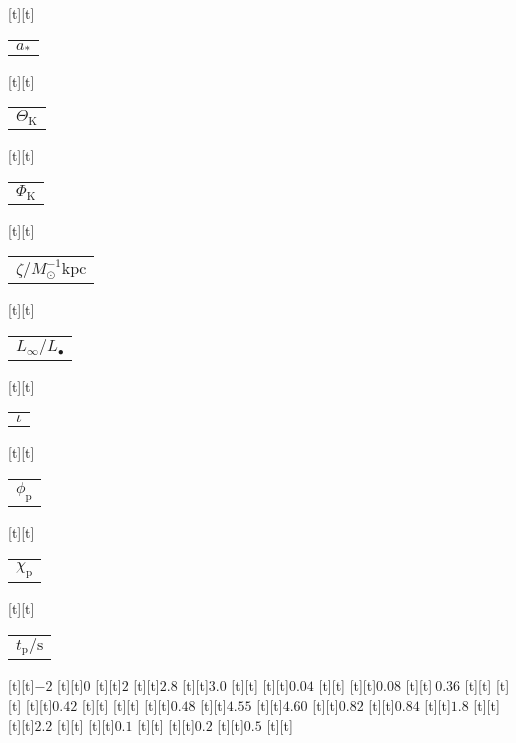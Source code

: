 \begin{psfrags}
[t][t]{\color[rgb]{0,0,0}\setlength{\tabcolsep}{0pt}\begin{tabular}{c}{$a_\ast$}\end{tabular}}%
[t][t]{\color[rgb]{0,0,0}\setlength{\tabcolsep}{0pt}\begin{tabular}{c}{$\Theta_\mathrm{K}$}\end{tabular}}%
[t][t]{\color[rgb]{0,0,0}\setlength{\tabcolsep}{0pt}\begin{tabular}{c}{$\Phi_\mathrm{K}$}\end{tabular}}%
[t][t]{\color[rgb]{0,0,0}\setlength{\tabcolsep}{0pt}\begin{tabular}{c}{$\zeta/M_\odot^{-1} \mathrm{kpc}$}\end{tabular}}%
[t][t]{\color[rgb]{0,0,0}\setlength{\tabcolsep}{0pt}\begin{tabular}{c}{$L_\infty/L_\bullet$}\end{tabular}}%
[t][t]{\color[rgb]{0,0,0}\setlength{\tabcolsep}{0pt}\begin{tabular}{c}{$\iota$}\end{tabular}}%
[t][t]{\color[rgb]{0,0,0}\setlength{\tabcolsep}{0pt}\begin{tabular}{c}{$\phi_\mathrm{p}$}\end{tabular}}%
[t][t]{\color[rgb]{0,0,0}\setlength{\tabcolsep}{0pt}\begin{tabular}{c}{$\chi_\mathrm{p}$}\end{tabular}}%
[t][t]{\color[rgb]{0,0,0}\setlength{\tabcolsep}{0pt}\begin{tabular}{c}{$t_\mathrm{p}/\mathrm{s}$}\end{tabular}}%
%
[t][t]{$-2$}%
[t][t]{$0$}%
[t][t]{$2$}%
[t][t]{$2.8$}%
[t][t]{$3.0$}%
[t][t]{}%
[t][t]{$0.04$}%
[t][t]{}%
[t][t]{$0.08$}%
[t][t]{$\:0.36$}%
[t][t]{}%
[t][t]{}%
[t][t]{$0.42$}%
[t][t]{}%
[t][t]{}%
[t][t]{$0.48$}%
[t][t]{$4.55$}%
[t][t]{$4.60$}%
[t][t]{$0.82$}%
[t][t]{$0.84$}%
[t][t]{$1.8$}%
[t][t]{}%
[t][t]{$2.2$}%
[t][t]{}%
[t][t]{$0.1$}%
[t][t]{}%
[t][t]{$0.2$}%
[t][t]{$0.5$}%
[t][t]{}%

\end{psfrags}
